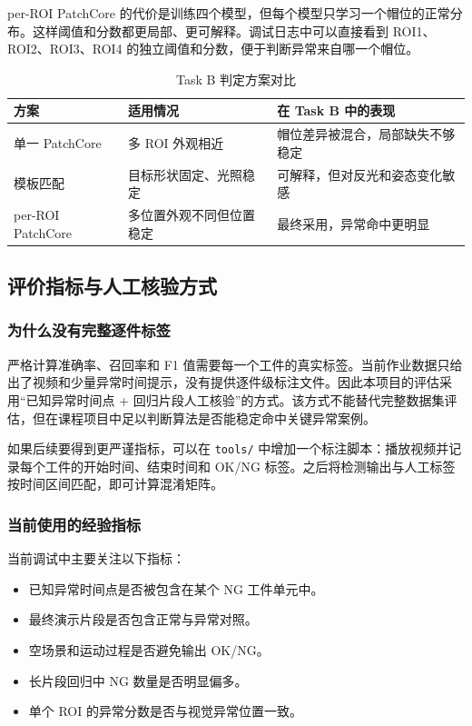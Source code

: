 \documentclass[12pt,hyperref,a4paper,UTF8,fontset=fandol]{ctexart}
\begin{document}
per-ROI PatchCore 的代价是训练四个模型，但每个模型只学习一个帽位的正常分布。这样阈值和分数都更局部、更可解释。调试日志中可以直接看到 ROI1、ROI2、ROI3、ROI4 的独立阈值和分数，便于判断异常来自哪一个帽位。

\begin{table}[H]
    \centering
    \begin{tabular}{p{}p{}p{}}
        \toprule
        方案 & 适用情况 & 在 Task B 中的表现 \\
        \midrule
        单一 PatchCore & 多 ROI 外观相近 & 帽位差异被混合，局部缺失不够稳定 \\
        模板匹配 & 目标形状固定、光照稳定 & 可解释，但对反光和姿态变化敏感 \\
        per-ROI PatchCore & 多位置外观不同但位置稳定 & 最终采用，异常命中更明显 \\
        \bottomrule
    \end{tabular}
    \caption{Task B 判定方案对比}
\end{table}

\newpage
\subsection{评价指标与人工核验方式}

\subsubsection{为什么没有完整逐件标签}

严格计算准确率、召回率和 F1 值需要每一个工件的真实标签。当前作业数据只给出了视频和少量异常时间提示，没有提供逐件级标注文件。因此本项目的评估采用“已知异常时间点 + 回归片段人工核验”的方式。该方式不能替代完整数据集评估，但在课程项目中足以判断算法是否能稳定命中关键异常案例。

如果后续要得到更严谨指标，可以在 \texttt{tools/} 中增加一个标注脚本：播放视频并记录每个工件的开始时间、结束时间和 OK/NG 标签。之后将检测输出与人工标签按时间区间匹配，即可计算混淆矩阵。

\subsubsection{当前使用的经验指标}

当前调试中主要关注以下指标：

\begin{itemize}
    \item 已知异常时间点是否被包含在某个 NG 工件单元中。
    \item 最终演示片段是否包含正常与异常对照。
    \item 空场景和运动过程是否避免输出 OK/NG。
    \item 长片段回归中 NG 数量是否明显偏多。
    \item 单个 ROI 的异常分数是否与视觉异常位置一致。
\end{itemize}
\end{document}
